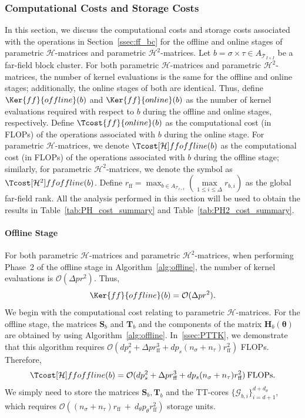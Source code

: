 \documentclass[final,3p,times]{elsarticle}
\newcommand{\mc}[1]{\mathcal{#1}}
\renewcommand{\vec}[1]{\boldsymbol{#1}}
\newcommand{\mat}[1]{\boldsymbol{#1}}
\newcommand{\ten}[1]{\boldsymbol{\mathcal{#1}}}
\begin{document}
\subsubsection{Computational Costs and Storage Costs}
In this section, we discuss the computational costs and storage costs associated with the operations in Section~\ref{ssec:ff_bc} for the offline and online stages of parametric $\mc{H}$-matrices and parametric $\mc{H}^{2}$-matrices. Let $b = \sigma \times \tau \in A_{\mc{T}_{I \times I}}$ be a far-field block cluster. For both parametric $\mc{H}$-matrices and parametric $\mc{H}^{2}$-matrices, the number of kernel evaluations is the same for the offline and online stages; additionally, the online stages of both  are identical. Thus, define   $\Ker{ff}{offline}(b)$ and $\Ker{ff}{online}(b)$  as the number of kernel evaluations required with respect to $b$ during the offline and online stages, respectively.  Define  $\Tcost{ff}{online}(b)$ as the computational cost (in FLOPs) of the operations associated with $b$ during the online stage. For parametric $\mc{H}$-matrices, we denote  $\Tcost[\mc{H}]{ff}{offline}(b)$  as the computational cost (in FLOPs) of the operations associated with $b$ during the offline stage; similarly, for parametric $\mc{H}^{2}$-matrices, we denote the symbol as $\Tcost[\mc{H}^{2}]{ff}{offline}(b)$. Define $r_{\text{ff}} = \max_{b \in A_{\mc{T}_{I \times I}}} (\underset{1 \le i \le \Delta}{\max}r_{b,i})$ as the global far-field rank. All the analysis performed in this section will be used to obtain the results in Table~\ref{tab:PH_cost_summary} and Table~\ref{tab:PH2_cost_summary}. 


\paragraph{Offline Stage}
 For both parametric $\mc{H}$-matrices and parametric $\mc{H}^{2}$-matrices,  when performing Phase~2 of the offline stage in Algorithm~\ref{alg:offline},  the number of kernel evaluations is $\mc{O}(\Delta pr^2)$. Thus, 
 \begin{equation}\label{keqn:ff_offline}
 \Ker{ff}{offline}(b) = \mc{O}(\Delta pr^2).
 \end{equation}
We begin with the computational cost relating to parametric $\mc{H}$-matrices.  For the offline stage,  the matrices $\mat{S}_{b}$ and $\mat{T}_{b}$ and the components of the matrix $\mat{H}_{b}(\vec{\theta})$ are obtained by using Algorithm~\ref{alg:offline}. 
In~\ref{ssec:PTTK}, we demonstrate that this  algorithm requires   $\mc{O}(dp_s^2 +  \Delta pr_{\text{ff}}^3 + dp_s(n_{\sigma} + n_{\tau})r_{\text{ff}}^2)$ FLOPs. Therefore,
\begin{equation}\label{ceqn:H_ff_offline} \Tcost[\mc{H}]{ff}{offline}(b) = \mc{O}(dp_s^2 + \Delta pr_{\text{ff}}^3 + dp_s(n_{\sigma} + n_{\tau})r_{\text{ff}}^2)\> \text{FLOPs}.
\end{equation}
We simply need to store the matrices $\mat{S}_{b}, \mat{T}_{b}$ and the TT-cores $\{\ten{G}_{b, i} \}_{i= d + 1}^{d+d_{\theta}}$, which requires $\mc{O}((n_{\sigma} + n_{\tau})r_{\text{ff}} ~+ ~ d_{\theta}p_{\theta}r_{\text{ff}}^2)$ storage units. 
\end{document}
